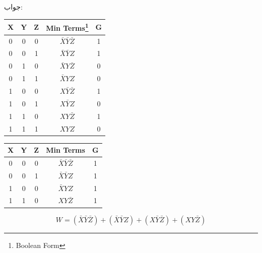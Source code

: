 \documentclass[20pt, a4paper]{article}
\begin{document}
جواب:\\
\begin{LTR}
	\begin{tabular}{ c c c | c | c }		
		X & Y & Z & Min Terms\footnote{Boolean Form} & G \\
		\hline
		  0 & 0  & 0  & $\bar{X} \bar{Y} \bar{Z}$  &1 \\
		  0 & 0  & 1  & $\bar{X} \bar{Y} Z$  &1 \\
		  0 & 1  & 0  & $\bar{X} Y \bar{Z}$  &0 \\
		  0 & 1  & 1  & $\bar{X} Y Z$  &0 \\
		  1 & 0  & 0  & $ X \bar{Y} \bar{Z} $  &1 \\
		  1 & 0  & 1  & $X \bar{Y} Z$  &0 \\
		  1 & 1  & 0  & $X Y \bar{Z}$  &1 \\
		  1 & 1  & 1  & $X Y Z$  &0 \\
	\end{tabular}
\end{LTR}

\hfill \break
\begin{LTR}
	\begin{tabular}{ c c c | c | c }		
		X & Y & Z & Min Terms & G \\
		\hline
		  0 & 0  & 0  & $\bar{X} \bar{Y} \bar{Z}$  &1 \\
		  0 & 0  & 1  & $\bar{X} \bar{Y} Z$  &1 \\
		  1 & 0  & 0  & $\bar{X} Y Z$  &1 \\
		  1 & 1  & 0  & $X Y \bar{Z}$  &1 \\
	\end{tabular}
\end{LTR}

\begin{equation}
	W = (\bar{X} \bar{Y} \bar{Z}) +
	(\bar{X} \bar{Y} Z) +
	(X \bar{Y} \bar{Z}) +
	(X Y \bar{Z})
\end{equation}
\newpage
\end{document}
